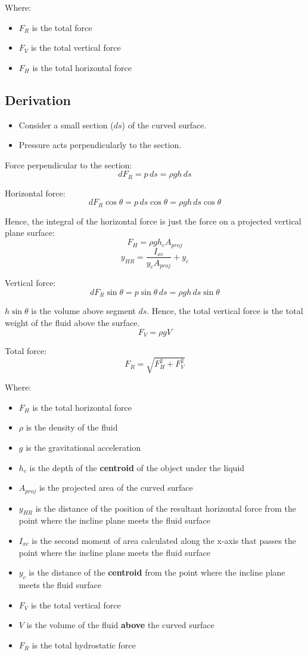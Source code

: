 \documentclass[11pt]{article}
\begin{document}
Where:
\begin{itemize}
\item \(F_R\) is the total force
\item \(F_V\) is the total vertical force
\item \(F_H\) is the total horizontal force
\end{itemize}

\subsection{Derivation}
\label{sec:org3663086}
\begin{itemize}
\item Consider a small section (\(ds\)) of the curved surface.
\item Pressure acts perpendicularly to the section.
\end{itemize}

Force perpendicular to the section:
\[dF_R = p \, ds = \rho g h \, ds\]

Horizontal force:
\[dF_R \cos \theta = p \, ds \cos \theta = \rho g h \, ds \cos \theta\]

Hence, the integral of the horizontal force is just the force on a projected vertical plane surface:
\[F_H = \rho g h_c A_{proj}\]
\[y_{HR} = \frac{I_{xc}}{y_c A_{proj}} + y_c\]

Vertical force:
\[dF_R \sin \theta = p \sin \theta \, ds = \rho g h \, ds \sin \theta\]

\(h \sin \theta\) is the volume above segment \(ds\). Hence, the total vertical force is the total weight of the fluid above the surface.
\[F_V = \rho g V\]

Total force:
\[F_R = \sqrt{F_H^2 + F_V^2}\]

\newpage

Where:
\begin{itemize}
\item \(F_H\) is the total horizontal force
\item \(\rho\) is the density of the fluid
\item \(g\) is the gravitational acceleration
\item \(h_c\) is the depth of the \textbf{centroid} of the object under the liquid
\item \(A_{proj}\) is the projected area of the curved surface
\item \(y_{HR}\) is the distance of the position of the resultant horizontal force from the point where the incline plane meets the fluid surface
\item \(I_{xc}\) is the second moment of area calculated along the x-axis that passes the point where the incline plane meets the fluid surface
\item \(y_c\) is the distance of the \textbf{centroid} from the point where the incline plane meets the fluid surface
\item \(F_V\) is the total vertical force
\item \(V\) is the volume of the fluid \textbf{above} the curved surface
\item \(F_R\) is the total hydrostatic force
\end{itemize}
\end{document}
